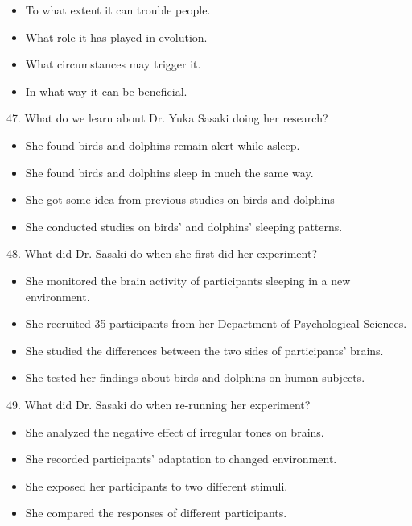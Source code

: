 \documentclass[UTF8,11pt]{ctexart}
\begin{document}
\begin{itemize}[leftmargin=2em,itemsep=.2em,topsep=.4em]\item[A.] To what extent it can trouble people.
\item[B.] What role it has played in evolution.
\item[C.] What circumstances may trigger it.
\item[D.] In what way it can be beneficial.
\end{itemize}

47. What do we learn about Dr. Yuka Sasaki doing her research?


\begin{itemize}[leftmargin=2em,itemsep=.2em,topsep=.4em]\item[A.] She found birds and dolphins remain alert while asleep.
\item[B.] She found birds and dolphins sleep in much the same way.
\item[C.] She got some idea from previous studies on birds and dolphins
\end{itemize}

\begin{itemize}[leftmargin=2em,itemsep=.2em,topsep=.4em]\item[D.] She conducted studies on birds’ and dolphins’ sleeping patterns.
\end{itemize}

48. What did Dr. Sasaki do when she first did her experiment?


\begin{itemize}[leftmargin=2em,itemsep=.2em,topsep=.4em]\item[A.] She monitored the brain activity of participants sleeping in a new environment.
\item[B.] She recruited 35 participants from her Department of Psychological Sciences.
\item[C.] She studied the differences between the two sides of participants’ brains.
\item[D.] She tested her findings about birds and dolphins on human subjects.
\end{itemize}

49. What did Dr. Sasaki do when re-running her experiment?


\begin{itemize}[leftmargin=2em,itemsep=.2em,topsep=.4em]\item[A.] She analyzed the negative effect of irregular tones on brains.
\item[B.] She recorded participants’ adaptation to changed environment.
\item[C.] She exposed her participants to two different stimuli.
\item[D.] She compared the responses of different participants.
\end{itemize}
\end{document}
